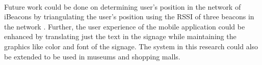 \documentclass[12pt]{article}
\begin{document}

\paragraph{}Future work could be done on determining user's position in the network of iBeacons by triangulating the user's position using the RSSI of three beacons in the network . Further, the user experience of the mobile application could be enhanced by translating just the text in the signage while maintaining the graphics like color and font of the signage. The system in this research could also be extended to be used in museums and shopping malls.

%


\cleardoublepage
{}
%


\end{document}
